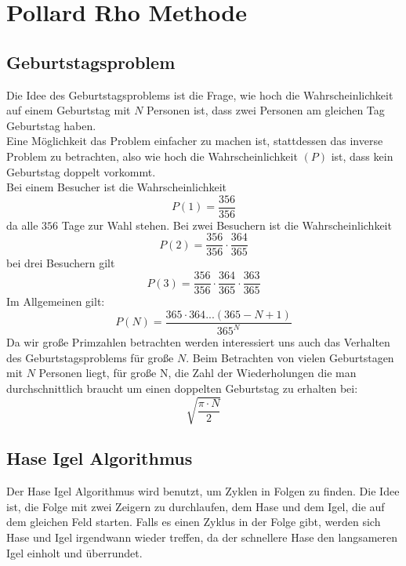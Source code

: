  
  
  \section{Pollard Rho Methode}
  \label{sec:pollard}
  \subsection{Geburtstagsproblem}
  Die Idee des Geburtstagsproblems ist die Frage, wie hoch die Wahrscheinlichkeit auf einem Geburtstag mit $N$ Personen ist, dass zwei Personen am gleichen Tag Geburtstag haben.\\
  Eine M\"oglichkeit das Problem einfacher zu machen ist, stattdessen das inverse Problem zu betrachten, also wie hoch die Wahrscheinlichkeit $(P)$ ist, dass kein Geburtstag doppelt vorkommt.\\
  Bei einem Besucher ist die Wahrscheinlichkeit
  \[P(1)=\frac{356}{356}\] 
  da alle $356$ Tage zur Wahl stehen. Bei zwei Besuchern ist die Wahrscheinlichkeit 
  \[P(2)=\frac{356}{356}\cdot \frac{364}{365}\]
  bei drei Besuchern gilt  
  \[P(3)=\frac{356}{356}\cdot \frac{364}{365} \cdot \frac{363}{365}\]
  Im Allgemeinen gilt: 
  \[P(N)= \frac{365 \cdot 364 ... (365-N+1)}{365^N}\]
  Da wir gro\ss e Primzahlen betrachten werden interessiert uns auch das Verhalten des Geburtstagsproblems f\"ur gro\ss e $N$.
  Beim Betrachten von vielen Geburtstagen mit $N$ Personen liegt, f\"ur gro\ss e N, die Zahl der Wiederholungen die man durchschnittlich braucht um einen doppelten Geburtstag zu erhalten bei: 
  \[\sqrt{\frac{\pi \cdot N}{2}}\]
  
  \subsection{Hase Igel Algorithmus}
  \label{sec:hase}
  Der Hase Igel Algorithmus wird benutzt, um Zyklen in Folgen zu finden. Die Idee ist, die Folge mit zwei Zeigern zu durchlaufen, dem Hase und dem Igel, die auf dem gleichen Feld starten. Falls es einen Zyklus in der Folge gibt, werden sich Hase und Igel irgendwann wieder treffen, da der schnellere Hase den langsameren Igel einholt und \"uberrundet.

